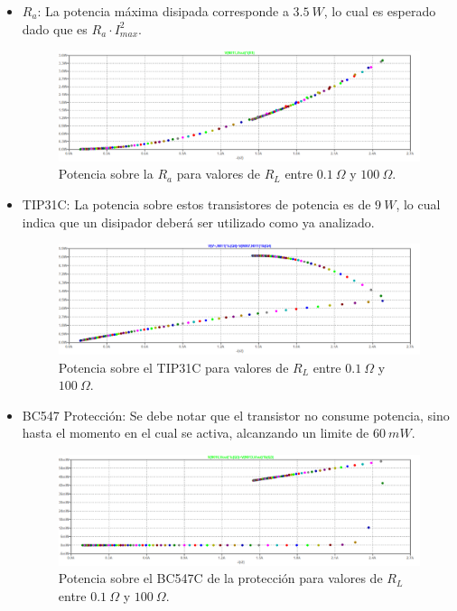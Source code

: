 \begin{itemize}
\item $R_a$: La potencia máxima disipada corresponde a $3.5 \ W$, lo cual es esperado dado que es $R_a\cdot I_{max}^2$. 
\begin{figure}[H]
\centering
	\includegraphics[width=1\textwidth]{ImagenesEjercicio2/potra.png}
	\caption{Potencia sobre la $R_a$ para valores de $R_L$ entre $0.1 \ \Omega$ y $100 \ \Omega$.}
	\label{fig:potra}
\end{figure}

\item TIP31C: La potencia sobre estos transistores de potencia es de $9 \ W$, lo cual indica que un disipador deberá ser utilizado como ya analizado.
\begin{figure}[H]
\centering
	\includegraphics[width=1\textwidth]{ImagenesEjercicio2/pottip31c.png}
	\caption{Potencia sobre el TIP31C para valores de $R_L$ entre $0.1 \ \Omega$ y $100 \ \Omega$.}
	\label{fig:pottip31}
\end{figure}

\item BC547 Protección: Se debe notar que el transistor no consume potencia, sino hasta el momento en el cual se activa, alcanzando un limite de $60 \ mW$.
\begin{figure}[H]
\centering
	\includegraphics[width=1\textwidth]{ImagenesEjercicio2/potprot.png}
	\caption{Potencia sobre el BC547C de la protección para valores de $R_L$ entre $0.1 \ \Omega$ y $100 \ \Omega$.}
	\label{fig:potbc547prot}
\end{figure}


\end{itemize}
